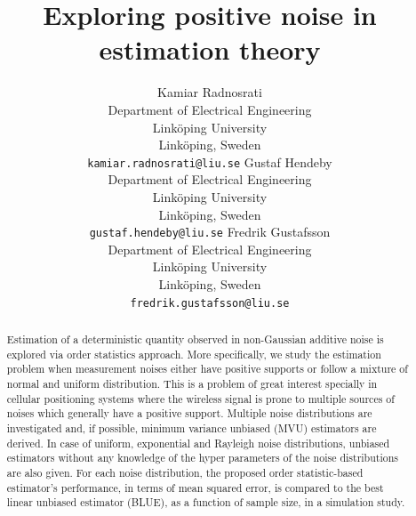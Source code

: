 \documentclass{article}
\title{Exploring positive noise in estimation theory}
\author{Kamiar Radnosrati \\  Department of Electrical Engineering\\
  		  Link\"oping University\\Link\"oping, Sweden\\ \texttt{kamiar.radnosrati@liu.se} 
  		 \And Gustaf Hendeby \\ Department of Electrical Engineering\\
  		 Link\"oping University\\Link\"oping, Sweden\\\texttt{gustaf.hendeby@liu.se}  \And Fredrik Gustafsson\\  Department of Electrical Engineering\\
  		 Link\"oping University\\Link\"oping, Sweden\\\texttt{fredrik.gustafsson@liu.se} }
\begin{document}
\maketitle

\begin{abstract}
Estimation of a deterministic quantity observed in non-Gaussian additive noise is explored via order statistics approach.  More specifically, we study the estimation problem when measurement noises either have positive supports or follow a mixture of normal and uniform distribution. This is a problem of great interest specially in cellular positioning systems where the wireless signal is prone to multiple sources of noises which generally have a positive support. Multiple noise distributions are investigated and, if possible, minimum variance unbiased (MVU) estimators are derived. In case of uniform, exponential and Rayleigh noise distributions, unbiased estimators without any knowledge of the hyper parameters of the noise distributions are also given. For each noise distribution, the proposed order statistic-based estimator's performance, in terms of  mean squared error, is compared to the best linear unbiased estimator (BLUE), as a function of sample size, in a simulation study.
\end{abstract}



\end{document}
